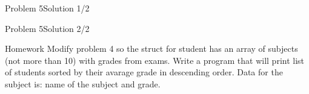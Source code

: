\begin{frame}[fragile]{Problem 5}{Solution 1/2}

\end{frame}

\begin{frame}[fragile]{Problem 5}{Solution 2/2}

\end{frame}

\begin{frame}{Homework}
Modify problem 4 so the struct for student has an array of subjects (not more
than 10) with grades from exams. Write a program that will print list of
students sorted by their avarage grade in descending order. Data for the subject
is: name of the subject and grade.
\end{frame}
